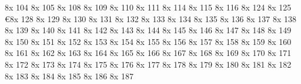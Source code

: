 \characterdef \hsuperior   8x   104
\characterdef \isuperior   8x   105
\characterdef \lsuperior   8x   108
\characterdef \msuperior   8x   109
\characterdef \nsuperior   8x   110
\characterdef \osuperior   8x   111
\characterdef \rsuperior   8x   114
\characterdef \ssuperior   8x   115
\characterdef \tsuperior   8x   116
\characterdef \centsuperior   8x   124
\characterdef \florinsuperior   8x   125
\characterdef \euro           8x   128
\characterdef \eurosuperior   8x   129
\characterdef \zeronumr   8x   130
\characterdef \onenumr   8x   131
\characterdef \twonumr   8x   132
\characterdef \threenumr   8x   133
\characterdef \fournumr   8x   134
\characterdef \fivenumr   8x   135
\characterdef \sixnumr   8x   136
\characterdef \sevennumr   8x   137
\characterdef \eightnumr   8x   138
\characterdef \ninenumr   8x   139
\characterdef \zerodnom   8x   140
\characterdef \onednom   8x   141
\characterdef \twodnom   8x   142
\characterdef \threednom   8x   143
\characterdef \fourdnom   8x   144
\characterdef \fivednom   8x   145
\characterdef \sixdnom   8x   146
\characterdef \sevendnom   8x   147
\characterdef \eightdnom   8x   148
\characterdef \ninednom   8x   149
\characterdef \zeroinferior   8x   150
\characterdef \oneinferior   8x   151
\characterdef \twoinferior   8x   152
\characterdef \threeinferior   8x   153
\characterdef \fourinferior   8x   154
\characterdef \fiveinferior   8x   155
\characterdef \sixinferior   8x   156
\characterdef \seveninferior   8x   157
\characterdef \eightinferior   8x   158
\characterdef \nineinferior   8x   159
\characterdef \equivasymptotic   8x   160
\characterdef \equivalence   8x   161
\characterdef \precedes   8x   162
\characterdef \precedesequal   8x   163
\characterdef \lessmuch   8x   164
\characterdef \greatermuch   8x   165
\characterdef \follows   8x   166
\characterdef \followsequal   8x   167
\characterdef \element   8x   168
\characterdef \owner   8x   169
\characterdef \propersubset   8x   170
\characterdef {}   8x   171
\characterdef \propersuperset   8x   172
\characterdef {}   8x   173
\characterdef \arrowsouthwest   8x   174
\characterdef \arrowsoutheast   8x   175
\characterdef \arrownorthwest   8x   176
\characterdef \arrownortheast   8x   177
\characterdef \arrowleft   8x   178
\characterdef \arrowright   8x   179
\characterdef \arrowboth   8x   180
\characterdef \arrowup   8x   181
\characterdef \arrowdown   8x   182
\characterdef \arrowdblleft   8x   183
\characterdef \arrowdblright   8x   184
\characterdef \arrowdblup   8x   185
\characterdef \arrowdbldown   8x   186
\characterdef \arrowdblboth   8x   187
